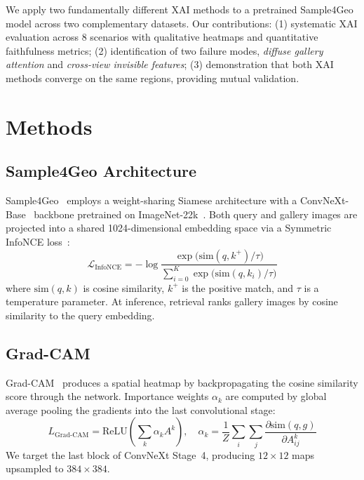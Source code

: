 \documentclass{article}
\begin{document}
We apply two fundamentally different XAI methods to a pretrained Sample4Geo model across two complementary datasets.
Our contributions: (1) systematic XAI evaluation across 8 scenarios with qualitative heatmaps and quantitative faithfulness metrics; (2) identification of two failure modes, \emph{diffuse gallery attention} and \emph{cross-view invisible features}; (3) demonstration that both XAI methods converge on the same regions, providing mutual validation.

\section{Methods}
\label{sec:methods}

\subsection{Sample4Geo Architecture}

Sample4Geo~\citep{deuser2023sample4geo} employs a weight-sharing Siamese architecture with a ConvNeXt-Base~\citep{liu2022convnext} backbone pretrained on ImageNet-22k~\citep{deng2009imagenet}.
Both query and gallery images are projected into a shared 1024-dimensional embedding space via a Symmetric InfoNCE loss~\citep{oord2018infonce}:
\begin{equation}
    \mathcal{L}_{\text{InfoNCE}} = -\log \frac{\exp\bigl(\text{sim}(q, k^+)/\tau\bigr)}{\sum_{i=0}^{K} \exp\bigl(\text{sim}(q, k_i)/\tau\bigr)}
    \label{eq:infonce}
\end{equation}
where $\text{sim}(q, k)$ is cosine similarity, $k^+$ is the positive match, and $\tau$ is a temperature parameter.
At inference, retrieval ranks gallery images by cosine similarity to the query embedding.

\subsection{Grad-CAM}

Grad-CAM~\citep{selvaraju2017gradcam} produces a spatial heatmap by backpropagating the cosine similarity score through the network.
Importance weights $\alpha_k$ are computed by global average pooling the gradients into the last convolutional stage:
\begin{equation}
    L_{\text{Grad-CAM}} = \text{ReLU}\left(\sum_k \alpha_k A^k\right), \quad \alpha_k = \frac{1}{Z}\sum_i\sum_j \frac{\partial \text{sim}(q,g)}{\partial A^k_{ij}}
    \label{eq:gradcam}
\end{equation}
We target the last block of ConvNeXt Stage~4, producing $12\times12$ maps upsampled to $384\times384$.
\end{document}
